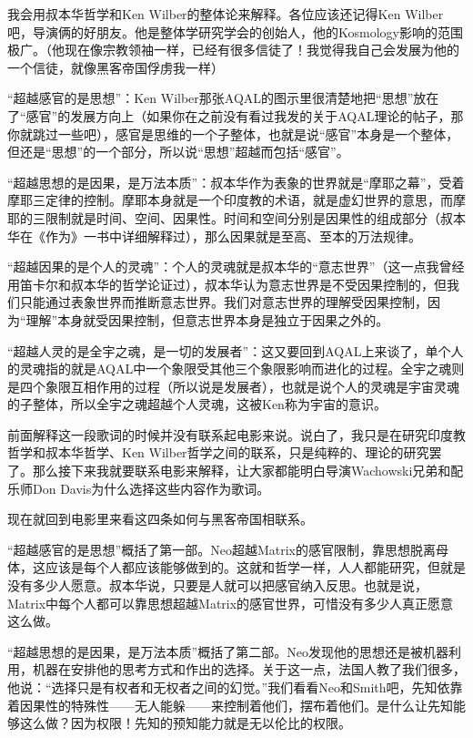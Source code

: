 \documentclass[UTF8]{ctexart}
\begin{document}
我会用叔本华哲学和Ken Wilber的整体论来解释。各位应该还记得Ken Wilber吧，导演俩的好朋友。他是整体学研究学会的创始人，他的Kosmology影响的范围极广。（他现在像宗教领袖一样，已经有很多信徒了！我觉得我自己会发展为他的一个信徒，就像黑客帝国俘虏我一样）

“超越感官的是思想”：Ken Wilber那张AQAL的图示里很清楚地把“思想”放在了“感官”的发展方向上（如果你在之前没有看过我发的关于AQAL理论的帖子，那你就跳过一些吧），感官是思维的一个子整体，也就是说“感官”本身是一个整体，但还是“思想”的一个部分，所以说“思想”超越而包括“感官”。

“超越思想的是因果，是万法本质”：叔本华作为表象的世界就是“摩耶之幕”，受着摩耶三定律的控制。摩耶本身就是一个印度教的术语，就是虚幻世界的意思，而摩耶的三限制就是时间、空间、因果性。时间和空间分别是因果性的组成部分（叔本华在《作为》一书中详细解释过），那么因果就是至高、至本的万法规律。

“超越因果的是个人的灵魂”：个人的灵魂就是叔本华的“意志世界”（这一点我曾经用笛卡尔和叔本华的哲学论证过），叔本华认为意志世界是不受因果控制的，但我们只能通过表象世界而推断意志世界。我们对意志世界的理解受因果控制，因为“理解”本身就受因果控制，但意志世界本身是独立于因果之外的。

“超越人灵的是全宇之魂，是一切的发展者”：这又要回到AQAL上来谈了，单个人的灵魂指的就是AQAL中一个象限受其他三个象限影响而进化的过程。全宇之魂则是四个象限互相作用的过程（所以说是发展者），也就是说个人的灵魂是宇宙灵魂的子整体，所以全宇之魂超越个人灵魂，这被Ken称为宇宙的意识。

前面解释这一段歌词的时候并没有联系起电影来说。说白了，我只是在研究印度教哲学和叔本华哲学、Ken Wilber哲学之间的联系，只是纯粹的、理论的研究罢了。那么接下来我就要联系电影来解释，让大家都能明白导演Wachowski兄弟和配乐师Don Davis为什么选择这些内容作为歌词。

现在就回到电影里来看这四条如何与黑客帝国相联系。

“超越感官的是思想”概括了第一部。Neo超越Matrix的感官限制，靠思想脱离母体，这应该是每个人都应该能够做到的。这就和哲学一样，人人都能研究，但就是没有多少人愿意。叔本华说，只要是人就可以把感官纳入反思。也就是说，Matrix中每个人都可以靠思想超越Matrix的感官世界，可惜没有多少人真正愿意这么做。

“超越思想的是因果，是万法本质”概括了第二部。Neo发现他的思想还是被机器利用，机器在安排他的思考方式和作出的选择。关于这一点，法国人教了我们很多，他说：“选择只是有权者和无权者之间的幻觉。”我们看看Neo和Smith吧，先知依靠着因果性的特殊性——无人能躲——来控制着他们，摆布着他们。是什么让先知能够这么做？因为权限！先知的预知能力就是无以伦比的权限。
\end{document}
